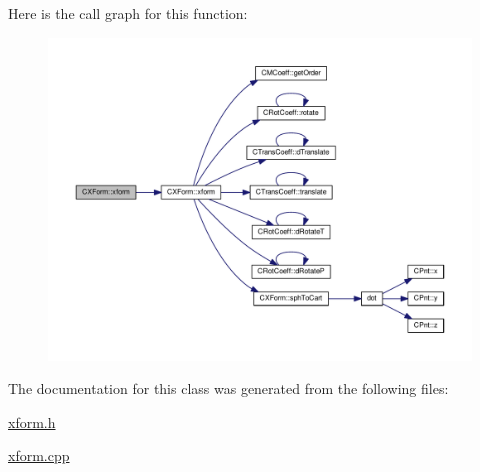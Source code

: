 Here is the call graph for this function\-:
\nopagebreak
\begin{figure}[H]
\begin{center}
\leavevmode
\includegraphics[width=350pt]{classCXForm_a7c8028608cadb13dfa6320be661256d6_cgraph}
\end{center}
\end{figure}




The documentation for this class was generated from the following files\-:\begin{DoxyCompactItemize}
\item 
\hyperlink{xform_8h}{xform.\-h}\item 
\hyperlink{xform_8cpp}{xform.\-cpp}\end{DoxyCompactItemize}
